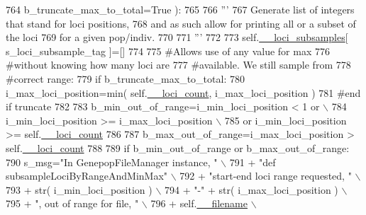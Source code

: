 \begin{DoxyCode}
764             b\_truncate\_max\_to\_total=\textcolor{keyword}{True} ):
765             
766         \textcolor{stringliteral}{'''}
767 \textcolor{stringliteral}{        Generate list of integers that stand for loci positions,}
768 \textcolor{stringliteral}{        and as such allow for printing all or a subset of the loci}
769 \textcolor{stringliteral}{        for a given pop/indiv.}
770 \textcolor{stringliteral}{}
771 \textcolor{stringliteral}{        '''}
772 
773         self.\hyperlink{classnegui_1_1genepopfilemanager_1_1GenepopFileManager_af867ba70728e8a3aaf0097ddd6399e28}{\_\_loci\_subsamples}[ s\_loci\_subsample\_tag ]=[]
774 
775         \textcolor{comment}{#Allows use of any value for max}
776         \textcolor{comment}{#without knowing how many loci are}
777         \textcolor{comment}{#available.  We still sample from}
778         \textcolor{comment}{#correct range:}
779         \textcolor{keywordflow}{if} b\_truncate\_max\_to\_total:
780             i\_max\_loci\_position=min( self.\hyperlink{classnegui_1_1genepopfilemanager_1_1GenepopFileManager_a89b855b2f9aa7f7570f9379edb17418e}{\_\_loci\_count}, i\_max\_loci\_position )
781         \textcolor{comment}{#end if truncate}
782 
783         b\_min\_out\_of\_range=i\_min\_loci\_position < 1 \textcolor{keywordflow}{or} \(\backslash\)
784                 i\_min\_loci\_position >= i\_max\_loci\_position \(\backslash\)
785                 \textcolor{keywordflow}{or}  i\_min\_loci\_position >= self.\hyperlink{classnegui_1_1genepopfilemanager_1_1GenepopFileManager_a89b855b2f9aa7f7570f9379edb17418e}{\_\_loci\_count} 
786 
787         b\_max\_out\_of\_range=i\_max\_loci\_position > self.\hyperlink{classnegui_1_1genepopfilemanager_1_1GenepopFileManager_a89b855b2f9aa7f7570f9379edb17418e}{\_\_loci\_count}
788                             
789         \textcolor{keywordflow}{if} b\_min\_out\_of\_range \textcolor{keywordflow}{or} b\_max\_out\_of\_range:
790             s\_msg=\textcolor{stringliteral}{"In GenepopFileManager instance, "} \(\backslash\)
791                         + \textcolor{stringliteral}{"def subsampleLociByRangeAndMinMax"} \(\backslash\)
792                         + \textcolor{stringliteral}{"start-end loci range requested, "} \(\backslash\)
793                         + str( i\_min\_loci\_position ) \(\backslash\)
794                         + \textcolor{stringliteral}{"-"} + str( i\_max\_loci\_position ) \(\backslash\)
795                         + \textcolor{stringliteral}{", out of range for file, "} \(\backslash\)
796                         + self.\hyperlink{classnegui_1_1genepopfilemanager_1_1GenepopFileManager_a2f6cd645e29db938befdf961d0819777}{\_\_filename} \(\backslash\)

\end{DoxyCode}
